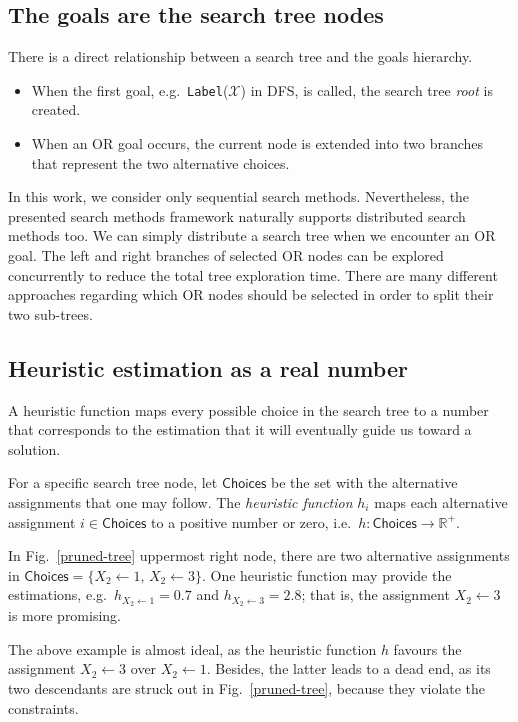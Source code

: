 \documentclass{ws-ijait}
\begin{document}
\subsection{The goals are the search tree nodes}

There is a direct relationship between a search tree and the
goals hierarchy.
\begin{itemize}
  \item When the first goal, e.g.\ 
        \texttt{Label}($\mathscr{X}$) in DFS, is called, the
        search tree \emph{root} is created.
  \item When an \textsf{OR} goal occurs, the current node is
        extended into two branches that represent the two
        alternative choices.
\end{itemize}
In this work, we consider only sequential search methods.
Nevertheless, the presented search methods framework
naturally supports distributed search methods too. We can
simply distribute a search tree when we encounter an
\textsf{OR} goal. The left and right branches of selected
\textsf{OR} nodes can be explored concurrently to reduce the
total tree exploration time. There are many different
approaches regarding which \textsf{OR} nodes should be
selected in order to split their two
sub-trees.\cite{Regin2014,Pothitos2016-CPMR}

\subsection{Heuristic estimation as a real number}

A heuristic function maps every possible choice in the
search tree to a number that corresponds to the estimation
that it will eventually guide us toward a solution.
\begin{definition}
  \label{heuristic-function}
  For a specific search tree node, let $\mathsf{Choices}$ be
  the set with the alternative assignments that one may
  follow. The \emph{heuristic function} $h_i$ maps each
  alternative assignment $i \in \mathsf{Choices}$ to a
  positive number or zero, i.e.\ $h: \mathsf{Choices} \to
  \mathbb{R}^+$.
\end{definition}
\begin{example}
  \label{heuristic-function-example}
  In Fig.~\ref{pruned-tree} uppermost right node, there are
  two alternative assignments in $\mathsf{Choices} = \{X_2
  \gets 1, \, X_2 \gets 3\}$. One heuristic function may
  provide the estimations, e.g.\ $h_{X_2 \gets 1} = 0.7$ and
  $h_{X_2 \gets 3} = 2.8$; that is, the assignment $X_2
  \gets 3$ is more promising.
\end{example}
The above example is almost ideal, as the heuristic function
$h$ favours the assignment $X_2 \gets 3$ over $X_2 \gets 1$.
Besides, the latter leads to a dead end, as its two
descendants are struck out in Fig.~\ref{pruned-tree},
because they violate the constraints.
\end{document}
